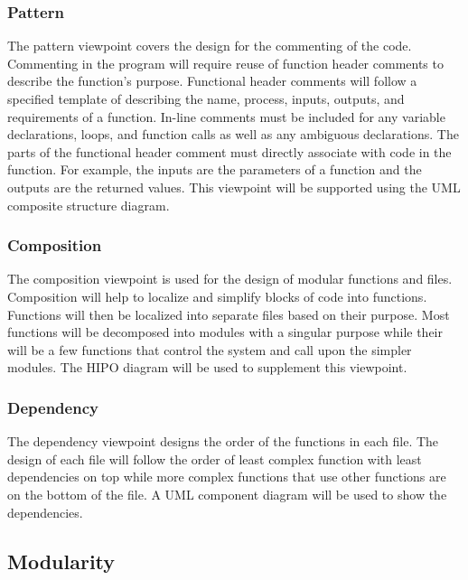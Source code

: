 \documentclass[10pt,letterpaper,onecolumn,draftclsnofoot]{IEEEtran}
\begin{document}
\subsubsection{Pattern}
	The pattern viewpoint covers the design for the commenting of the code. Commenting in the program will require reuse of function header comments to describe the function's purpose. Functional header comments will follow a specified template of describing the name, process, inputs, outputs, and requirements of a function. In-line comments must be included for any variable declarations, loops, and function calls as well as any ambiguous declarations. The parts of the functional header comment must directly associate with code in the function. For example, the inputs are the parameters of a function and the outputs are the returned values. This viewpoint will be supported using the UML composite structure diagram.
	
\subsubsection{Composition}
	The composition viewpoint is used for the design of modular functions and files. Composition will help to localize and simplify blocks of code into functions. Functions will then be localized into separate files based on their purpose. Most functions will be decomposed into modules with a singular purpose while their will be a few functions that control the system and call upon the simpler modules. The HIPO diagram will be used to supplement this viewpoint.

\subsubsection{Dependency}
	The dependency viewpoint designs the order of the functions in each file. The design of each file will follow the order of least complex function with least dependencies on top while more complex functions that use other functions are on the bottom of the file. A UML component diagram will be used to show the dependencies.
\subsection{Modularity}
\end{document}
